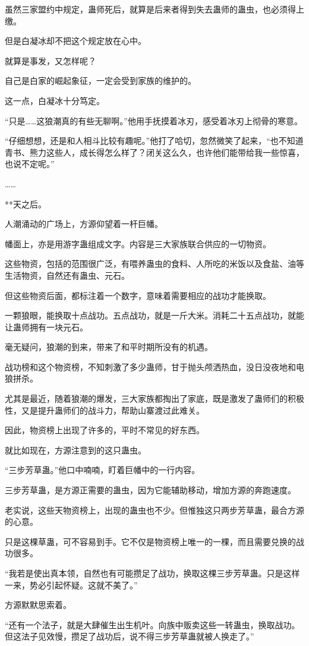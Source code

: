 \begin{this_body}
虽然三家盟约中规定，蛊师死后，就算是后来者得到失去蛊师的蛊虫，也必须得上缴。

但是白凝冰却不把这个规定放在心中。

就算是事发，又怎样呢？

自己是白家的崛起象征，一定会受到家族的维护的。

这一点，白凝冰十分笃定。

“只是……这狼潮真的有些无聊啊。”他用手抚摸着冰刃，感受着冰刃上彻骨的寒意。

“仔细想想，还是和人相斗比较有趣呢。”他打了哈切，忽然微笑了起来，“也不知道青书、熊力这些人，成长得怎么样了？闭关这么久，也许他们能带给我一些惊喜，也说不定呢。”

……

**天之后。

人潮涌动的广场上，方源仰望着一杆巨幡。

幡面上，亦是用游字蛊组成文字。内容是三大家族联合供应的一切物资。

这些物资，包括的范围很广泛，有喂养蛊虫的食料、人所吃的米饭以及食盐、油等生活物资，自然还有蛊虫、元石。

但这些物资后面，都标注着一个数字，意味着需要相应的战功才能换取。

一颗狼眼，能换取十点战功。五点战功，就是一斤大米。消耗二十五点战功，就能让蛊师拥有一块元石。

毫无疑问，狼潮的到来，带来了和平时期所没有的机遇。

战功榜和这个物资榜，不知刺激了多少蛊师，甘于抛头颅洒热血，没日没夜地和电狼拼杀。

尤其是最近，随着狼潮的爆发，三大家族都掏出了家底，既是激发了蛊师们的积极性，又是提升蛊师们的战斗力，帮助山寨渡过此难关。

因此，物资榜上出现了许多的，平时不常见的好东西。

就比如现在，方源注意到的这只蛊虫。

“三步芳草蛊。”他口中喃喃，盯着巨幡中的一行内容。

三步芳草蛊，是方源正需要的蛊虫，因为它能辅助移动，增加方源的奔跑速度。

老实说，这些天物资榜上，出现的蛊虫也不少。但惟独这只两步芳草蛊，最合方源的心意。

只是这棵草蛊，可不容易到手。它不仅是物资榜上唯一的一棵，而且需要兑换的战功很多。

“我若是使出真本领，自然也有可能攒足了战功，换取这棵三步芳草蛊。只是这样一来，势必引起怀疑。这就不美了。”

方源默默思索着。

“还有一个法子，就是大肆催生出生机叶。向族中贩卖这些一转蛊虫，换取战功。但这法子见效慢，攒足了战功后，说不得三步芳草蛊就被人换走了。”


\end{this_body}
